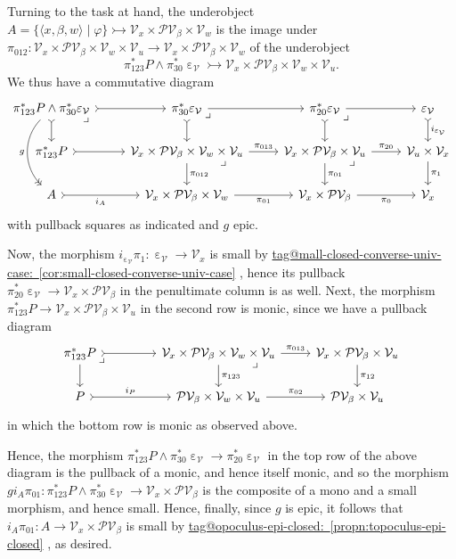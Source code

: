 \documentclass{amsart}
\makeatletter
\newcommand\br[1]{\langle{}#1\rangle{}}
\newcommand\cV{\mathcal{V}}
\newcommand\ein{\mathrel{\varepsilon}}
\newcommand\pb[1][rd]{\ar[#1, phantom, "\lrcorner", pos=0]}
\renewcommand\phi{\varphi}
\newcommand\pow{\mathcal{P}}
\newcommand\set[2][]{#1\{ #2 #1\}}
\newcommand\tto{\rightarrowtail}
\newcommand\unein{{\ein}}
\newcommand\tagword[1]{\csname tag@#1\endcsname}
\def\label@tag#1:#2\@nil{#1}
\newcommand\labeltag[1]{\label@tag#1:\@nil}
\newcommand\jref[1]{%
  \texorpdfstring%
    {\hyperref[#1]{\tagword{\labeltag{#1}}~\ref*{#1}}}%
    {\tagword{\labeltag{#1}}~\ref*{#1}}%
}
\theoremstyle{definition}
\theoremstyle{remark}
\theoremstyle{plainwithref}
\makeatother
\begin{document}
Turning to the task at hand, the underobject \( A = \set{\br{x, \beta, w} \mid \phi} \tto \cV_x \times \pow \cV_\beta \times \cV_w \) is the image under \( \pi_{012} \colon \cV_x \times \pow \cV_\beta \times \cV_w \times \cV_u \to \cV_x \times \pow \cV_\beta \times \cV_w \) of the underobject
\[
  \pi_{123}^* P \wedge \pi_{30}^* \unein_\cV \tto \cV_x \times \pow \cV_\beta \times \cV_w \times \cV_u.
\]
We thus have a commutative diagram
\[
  \begin{tikzcd}
    \pi_{123}^* P \wedge \pi_{30}^* \unein_\cV \pb \ar[r, >->] \ar[d, >->] \ar[dd, bend right=45pt, ->>, "g"'] & \pi_{30}^* \unein_\cV \pb \ar[d, >->] \ar[r] & \pi_{20}^* \unein_{\cV} \pb \ar[r] \ar[d, >->] & \unein_\cV \ar[d, "i_{\unein_\cV}", >->] \\
    \pi_{123}^* P \ar[r, >->] & \cV_x \times \pow \cV_\beta \times \cV_w \times \cV_u \pb \ar[d, "\pi_{012}"] \ar[r, "\pi_{013}"] & \cV_x \times \pow \cV_\beta \times \cV_u \pb \ar[d, "\pi_{01}"] \ar[r, "\pi_{20}"] & \cV_u \times \cV_x \ar[d, "\pi_1"] \\
    A \ar[r, "i_A"', >->] & \cV_x \times \pow \cV_\beta \times \cV_w \ar[r, "\pi_{01}"'] & \cV_x \times \pow \cV_\beta \ar[r, "\pi_0"'] & \cV_x
  \end{tikzcd}
\]
with pullback squares as indicated and \( g \) epic.

Now, the morphism \( i_{\unein_\cV} \pi_1 \colon \unein_\cV \to \cV_x \) is small by \jref{cor:small-closed-converse-univ-case}, hence its pullback \( \pi_{20}^* \unein_\cV \to \cV_x \times \pow \cV_\beta \) in the penultimate column is as well.
Next, the morphism \( \pi_{123}^* P \to \cV_x \times \pow \cV_\beta \times \cV_u \) in the second row is monic, since we have a pullback diagram
\[
  \begin{tikzcd}
    \pi_{123}^* P \pb \ar[r, >->] \ar[d] &[20pt] \cV_x \times \pow \cV_\beta \times \cV_w \times \cV_u \pb \ar[d, "\pi_{123}"] \ar[r, "\pi_{013}"] & \cV_x \times \pow \cV_\beta \times \cV_u \ar[d, "\pi_{12}"] \\
    P \ar[r, "i_P", >->] & \pow \cV_\beta \times \cV_w \times \cV_u \ar[r, "\pi_{02}"] & \pow \cV_\beta \times \cV_u
  \end{tikzcd}
\]
in which the bottom row is monic as observed above.

Hence, the morphism \( \pi_{123}^* P \wedge \pi_{30}^* \unein_\cV \to \pi_{20}^* \unein_\cV \) in the top row of the above diagram is the pullback of a monic, and hence itself monic, and so the morphism \( g i_A \pi_{01} \colon \pi_{123}^* P \wedge \pi_{30}^* \unein_\cV \to \cV_x \times \pow \cV_\beta \) is the composite of a mono and a small morphism, and hence small.
Hence, finally, since \( g \) is epic, it follows that \( i_A \pi_{01} \colon A \to \cV_x \times \pow \cV_\beta \) is small by \jref{propn:topoculus-epi-closed}, as desired.
\end{document}
